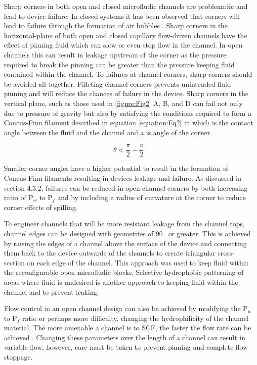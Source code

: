 Sharp corners in both open and closed microfludic channels are problematic and lead to device failure. In closed systems it has been observed that corners will lead to failure through the formation of air bubbles \cite{Liu2015}. Sharp corners in the horizontal-plane of both open and closed capillary flow-driven channels have the effect of pinning fluid which can slow or even stop flow in the channel. In open channels this can result in leakage upstream of the corner as the pressure required to break the pinning can be greater than the pressure keeping fluid contained within the channel. To failures at channel corners, sharp corners should be avoided all together. Filleting channel corners prevents unintended fluid pinning and will reduce the chances of failure in the device. Sharp corners in the vertical plane, such as those used in \ref{figure:Fig2} A, B, and D can fail not only due to pressure of gravity but also by satisfying the conditions required to form a Concus-Finn filament described in equation \ref{equation:Eq2} in which \texttheta is the contact angle between the fluid and the channel and a is angle of the corner.

\begin{equation}
    \theta < \frac{\pi }{2}-\frac{a}{2}
    \label{equation:Eq2}
\end{equation}

Smaller corner angles have a higher potential to result in the formation of Concus-Finn filaments \cite{Berthier2015a} resulting in devices leakage and failure. As discussed in section 4.3.2, failures can be reduced in open channel corners by both increasing ratio of P$_w$ to P$_f$ and by including a radius of curvature at the corner to reduce corner effects of spilling. 

To engineer channels that will be more resistant leakage from the channel tops, channel edges can be designed with geometries of 90 \textdegree \, or greater. This is achieved by raising the edges of a channel above the surface of the device and connecting them back to the device outwards of the channels to create triangular cross-section on each edge of the channel. This approach was used to keep fluid within the reconfigurable open microfludic blocks. Selective hydrophobic patterning of areas where fluid is undesired is another approach to keeping fluid within the channel and to prevent leaking.

Flow control in an open channel design can also be achieved by modifying the P$_w$ to P$_f$ ratio or perhaps more difficulty, changing the hydrophilicity of the channel material. The more amenable a channel is to SCF, the faster the flow rate can be achieved \cite{Berthier2016}. Changing these parameters over the length of a channel can result in variable flow, however, care must be taken to prevent pinning and complete flow stoppage.

